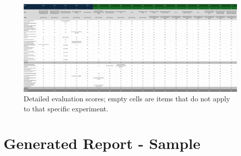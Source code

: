 \documentclass[a4paper]{report}
\begin{document}
\begin{figure}
    \centering
    \includegraphics[width=\textheight]{images/evals-detail.png}
    \caption{Detailed evaluation scores; empty cells are items that do not apply to that specific experiment.}
    \label{fig:evals-detailed}
\end{figure}

\chapter{Generated Report - Sample}
\end{document}
